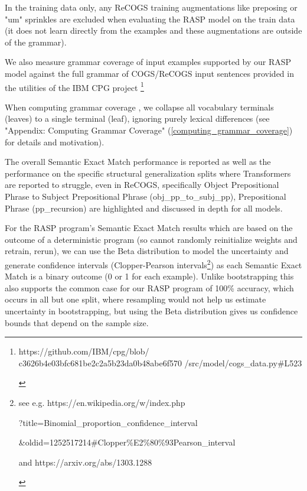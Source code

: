 \documentclass[11pt]{article}
\begin{document}
In the training data only, any ReCOGS training augmentations like preposing or "um" sprinkles are excluded when evaluating the RASP model on the train data (it does not learn directly from the examples and these augmentations are outside of the grammar). 

We also measure grammar coverage of input examples supported by our RASP model against the full grammar of COGS/ReCOGS input sentences provided in the utilities of the IBM CPG project \cite{klinger2024compositionalprogramgenerationfewshot}\footnote{\begin{footnotesize}https://github.com/IBM/cpg/blob/
c3626b4e03bfc681be2c2a5b23da0b48abe6f570
/src/model/cogs\_data.py\#L523 
\end{footnotesize}
}

When computing grammar coverage \cite{fuzzingbook2023:GrammarCoverageFuzzer}, we collapse all vocabulary terminals (leaves) to a single terminal (leaf), ignoring purely lexical differences (see "Appendix: Computing Grammar Coverage" (\ref{computing_grammar_coverage}) for details and motivation).

The overall Semantic Exact Match performance is reported as well as the performance on the specific structural generalization splits where Transformers are reported to struggle, even in ReCOGS, specifically Object Prepositional Phrase to Subject Prepositional Phrase (obj\_pp\_to\_subj\_pp),
Prepositional Phrase (pp\_recursion) are highlighted and discussed in depth for all models.

For the RASP program's Semantic Exact Match results which are based on the outcome of a deterministic program (so cannot randomly reinitialize weights and retrain, rerun),
we can use the Beta distribution to model the uncertainty and generate confidence intervals (Clopper-Pearson intervals\footnote{\begin{footnotesize}see e.g. 
https://en.wikipedia.org/w/index.php

?title=Binomial\_proportion\_confidence\_interval

\&oldid=1252517214\#Clopper\%E2\%80\%93Pearson\_interval

and https://arxiv.org/abs/1303.1288 
\end{footnotesize}
}) as each Semantic Exact Match is a binary outcome (0 or 1 for each example). Unlike bootstrapping this also supports the common case for our RASP program of 100\% accuracy, which occurs in all but one split, where resampling would not help us estimate uncertainty in bootstrapping, but using the Beta distribution gives us confidence bounds that depend on the sample size.
\end{document}
